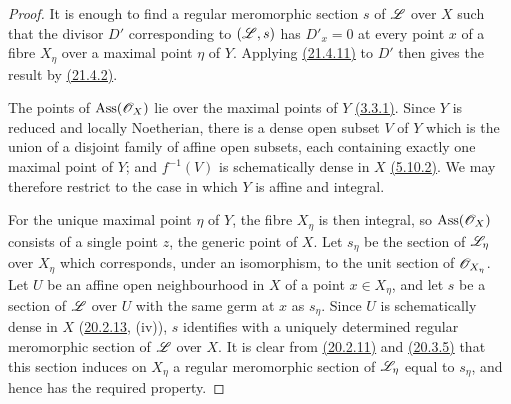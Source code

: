 \begin{proof}
It is enough to find a regular meromorphic section $s$ of $\mathscr{L}$ over
$X$ such that the divisor $D'$ corresponding to $(\mathscr{L},s)$ has
$D'_x=0$ at every point $x$ of a fibre $X_\eta$ over a maximal point
$\eta$ of $Y$.  Applying {\hyperref[IV.21.4.11]{(21.4.11)}} to $D'$ then gives the result by
{\hyperref[IV.21.4.2]{(21.4.2)}}.

The points of $\operatorname{Ass}(\mathscr{O}_X)$ lie over the maximal
points of $Y$ {\hyperref[IV.3.3.1]{(3.3.1)}}.  Since $Y$ is reduced and locally Noetherian,
there is a dense open subset $V$ of $Y$ which is the union of a
disjoint family of affine open subsets, each containing exactly one
maximal point of $Y$; and $f^{-1}(V)$ is schematically dense in $X$
{\hyperref[IV.5.10.2]{(5.10.2)}}.  We may therefore restrict to the case in which $Y$ is
affine and integral.

For the unique maximal point $\eta$ of $Y$, the fibre $X_\eta$ is then
integral, so $\operatorname{Ass}(\mathscr{O}_X)$ consists of a single point
$z$, the generic point of $X$.  Let $s_\eta$ be the section of
$\mathscr{L}_\eta$ over $X_\eta$ which corresponds, under an isomorphism,
to the unit section of $\mathscr{O}_{X_\eta}$.  Let $U$ be an affine open
neighbourhood in $X$ of a point $x\in X_\eta$, and let $s$ be a section
of $\mathscr{L}$ over $U$ with the same germ at $x$ as $s_\eta$.  Since $U$
is schematically dense in $X$ ({\hyperref[IV.20.2.13]{20.2.13}}, (iv)), $s$ identifies with a
uniquely determined regular meromorphic section of $\mathscr{L}$ over $X$.
It is clear from {\hyperref[IV.20.2.11]{(20.2.11)}} and {\hyperref[IV.20]{(20.3.5)}} that this section induces on
$X_\eta$ a regular meromorphic section of $\mathscr{L}_\eta$ equal to
$s_\eta$, and hence has the required property.
\end{proof}
